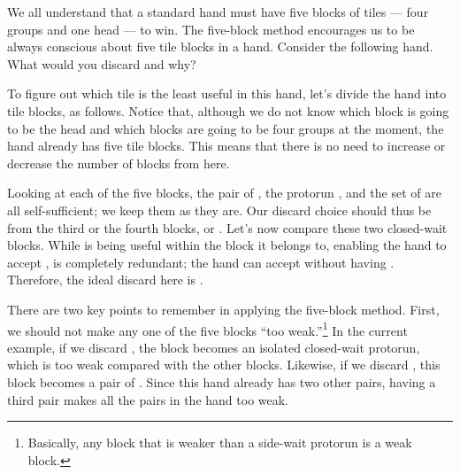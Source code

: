 We all understand that a standard hand
must have five blocks of tiles --- four groups and one head --- to win.
The five-block method encourages us to be always conscious about five tile blocks in a hand.
Consider the following hand. What would you discard and why?

\bp
{}\zhong\zhong\zhong
\ep

To figure out which tile is the least useful in this hand, let's divide the hand into tile blocks, as follows.
\emj
Notice that, although we do not know which block is going to be the head and which blocks are going to be four groups at the moment, the hand already has five tile blocks. This means that there is no need to increase or decrease the number of blocks from here.

\bigskip
Looking at each of the five blocks, the pair of {\LARGE{}}, the protorun {\LARGE{}}, and the set of {\LARGE\zhong} are all self-sufficient; we keep them as they are. Our discard choice should thus be from the third or the fourth blocks, {\LARGE{}} or {\LARGE{}}.
Let's now compare these two closed-wait blocks. While {\LARGE{}} is being useful within the block it belongs to, enabling the hand to accept {\LARGE{}}, {\LARGE{}} is completely redundant; the hand can accept {\LARGE{}} without having {\LARGE{}}. Therefore, the ideal discard here is {\LARGE{}}.

\bigskip
There are two key points to remember in applying the five-block method.
First, we should not make any one of the five blocks ``too weak.''\footnote{Basically, any block that is weaker than a side-wait protorun is a weak block.} In the current example, if we discard {\LARGE{}}, the {\LARGE{}} block becomes an isolated closed-wait protorun, which is too weak compared with the other blocks. Likewise, if we discard {\LARGE{}}, this block becomes a pair of {\LARGE{}}. Since this hand already has two other pairs, having a third pair makes all the pairs in the hand too weak.

